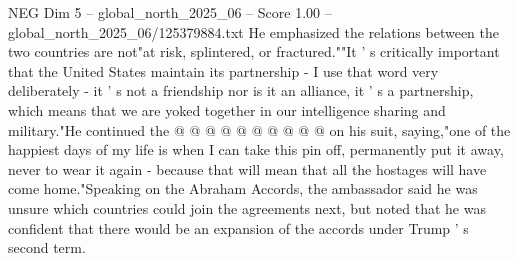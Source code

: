 \begin{textsample}{NEG Dim 5 – global\_north\_2025\_06 – Score 1.00 – global\_north\_2025\_06/125379884.txt}
He emphasized the relations between the two countries are not"at risk, splintered, or fractured.""It ' s critically important that the United States maintain its partnership - I use that word very deliberately - it ' s not a friendship nor is it an alliance, it ' s a partnership, which means that we are yoked together in our intelligence sharing and military."He continued the @ @ @ @ @ @ @ @ @ @ on his suit, saying,"one of the happiest days of my life is when I can take this pin off, permanently put it away, never to wear it again - because that will mean that all the hostages will have come home."Speaking on the Abraham Accords, the ambassador said he was unsure which countries could join the agreements next, but noted that he was confident that there would be an expansion of the accords under Trump ' s second term.

\end{textsample}
